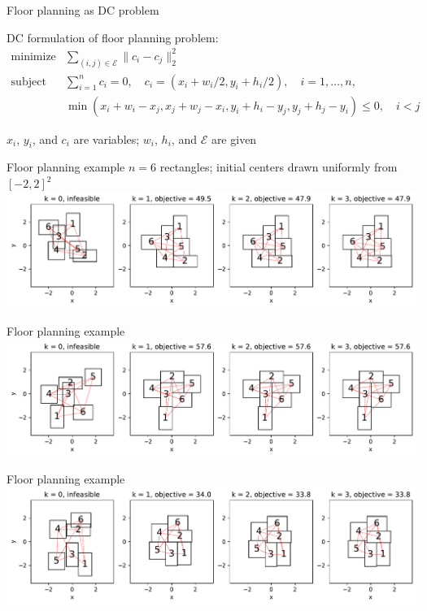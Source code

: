 \documentclass[aspectratio=169,11pt]{beamer}
\begin{document}
\begin{frame}{Floor planning as DC problem}
\BIT
\item DC formulation of floor planning problem:
\[
\begin{array}{ll}
\mbox{minimize}
& \sum_{(i, j) \in \mathcal{E}} \|c_i - c_j\|_2^2\\
\mbox{subject to}
& \sum_{i=1}^n c_i = 0, \quad c_i = (x_i+w_i/2, y_i + h_i/2), \quad i = 1,\ldots, n,\\
& \min \left(x_i+w_i-x_j, x_j+w_j-x_i, y_i+h_i-y_j, y_j+h_j-y_i\right) \leq 0, \quad i < j
\end{array}
\]
\item $x_i$, $y_i$, and $c_i$ are variables;
$w_i$, $h_i$, and $\mathcal{E}$ are given
\EIT
\end{frame}

\begin{frame}{Floor planning example}
$n=6$ rectangles; initial centers drawn uniformly from $[-2, 2]^2$
\vfill
\centering
\includegraphics[width=\textwidth]{floor_planning_seed23.pdf}
\end{frame}

\begin{frame}{Floor planning example}
\centering
\includegraphics[width=\textwidth]{floor_planning_seed11.pdf}
\end{frame}

\begin{frame}{Floor planning example}
\centering
\includegraphics[width=\textwidth]{floor_planning_seed10.pdf}
\end{frame}
\end{document}
